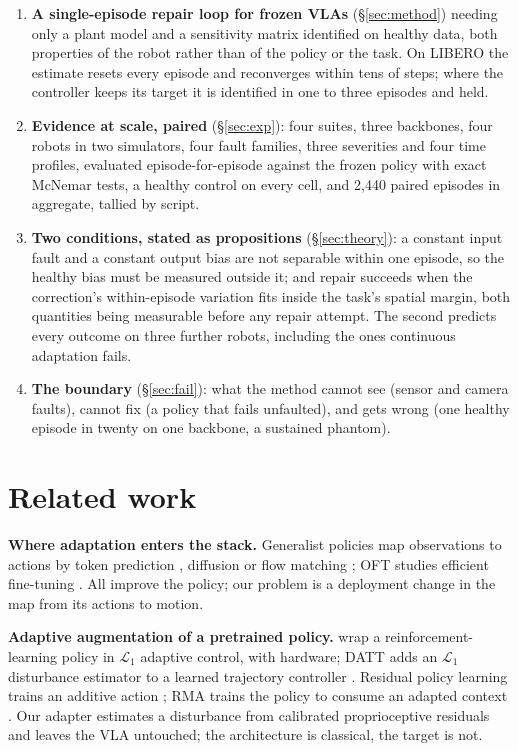 \documentclass{article}
\begin{document}
\begin{enumerate}[leftmargin=1.5em,itemsep=1pt]
\item \textbf{A single-episode repair loop for frozen VLAs} (\S\ref{sec:method}) needing
  only a plant model and a sensitivity matrix identified on healthy data, both properties of
  the robot rather than of the policy or the task. On LIBERO the estimate resets every
  episode and reconverges within tens of steps; where the controller keeps its target it
  is identified in one to three episodes and held.
\item \textbf{Evidence at scale, paired} (\S\ref{sec:exp}): four suites, three backbones, four
  robots in two simulators, four fault families, three severities and four time profiles,
  evaluated episode-for-episode against the frozen policy with exact McNemar tests, a
  healthy control on every cell, and 2,440 paired episodes in aggregate, tallied by script.
\item \textbf{Two conditions, stated as propositions} (\S\ref{sec:theory}): a constant input
  fault and a constant output bias are not separable within one episode, so the healthy
  bias must be measured outside it; and repair succeeds when the correction's
  within-episode variation fits inside the task's spatial margin, both quantities being
  measurable before any repair attempt. The second predicts every outcome on three
  further robots, including the ones continuous adaptation fails.
\item \textbf{The boundary} (\S\ref{sec:fail}): what the method cannot see (sensor and camera
  faults), cannot fix (a policy that fails unfaulted), and gets wrong (one healthy episode
  in twenty on one backbone, a sustained phantom).
\end{enumerate}

\section{Related work}
\label{sec:related}

\textbf{Where adaptation enters the stack.} Generalist policies map observations to actions
by token prediction \citep{rt2,openvla}, diffusion \citep{diffusionpolicy,octo} or flow
matching \citep{pi0,pi05}; OFT studies efficient fine-tuning \citep{openvlaoft}. All improve
the policy; our problem is a deployment change in the map from its actions to motion.

\textbf{Adaptive augmentation of a pretrained policy.} \citet{cheng2022l1rl} wrap a
reinforcement-learning policy in $\mathcal L_1$ adaptive control, with hardware; DATT adds an
$\mathcal L_1$ disturbance estimator to a learned trajectory controller \citep{huang2023datt}.
Residual policy learning trains an additive action \citep{silver2018residual,johannink2019residual};
RMA trains the policy to consume an adapted context \citep{kumar2021rma}. Our adapter estimates
a disturbance from calibrated proprioceptive residuals and leaves the VLA untouched; the
architecture is classical, the target is not.
\end{document}
